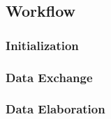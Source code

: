 \subsection{Workflow}
\label{sec:architecture:workflow}
\subsubsection{Initialization}
\subsubsection{Data Exchange}
\subsubsection{Data Elaboration}



